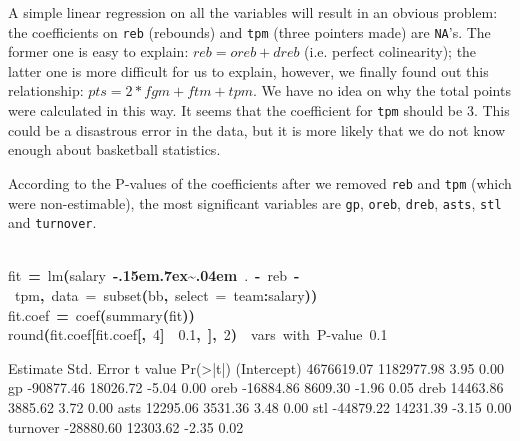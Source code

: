 \documentclass[english]{article}
\newenvironment{dummy}{\par}{\par}
\newcommand{\hlnumber}[1]{\textcolor[rgb]{0.0823529411764706,0.0784313725490196,0.709803921568627}{#1}}%
\newcommand{\hlfunctioncall}[1]{\textcolor[rgb]{1,0,0}{#1}}%
\newcommand{\hlkeyword}[1]{\textcolor[rgb]{0,0,0}{\textbf{#1}}}%
\newcommand{\hlargument}[1]{\textcolor[rgb]{0.694117647058824,0.247058823529412,0.0196078431372549}{#1}}%
\newcommand{\hlcomment}[1]{\textcolor[rgb]{0.8,0.8,0.8}{#1}}%
\newcommand{\hlassignement}[1]{\textcolor[rgb]{0.215686274509804,0.215686274509804,0.384313725490196}{\textbf{#1}}}%
\newcommand{\hlsymbol}[1]{\textcolor[rgb]{0,0,0}{#1}}%
\newcommand{\hlprompt}[1]{\textcolor[rgb]{0,0,0}{#1}}%
\def\urltilda{\kern -.15em\lower .7ex\hbox{\~{}}\kern .04em}%
\newcommand{\hlstd}[1]{\textcolor[rgb]{0,0,0}{#1}}%
\begin{document}
A simple linear regression on all the variables will result in an
obvious problem: the coefficients on \texttt{reb} (rebounds) and \texttt{tpm}
(three pointers made) are \texttt{NA}'s. The former one is easy to
explain: $reb=oreb+dreb$ (i.e. perfect colinearity); the latter one
is more difficult for us to explain, however, we finally found out
this relationship: $pts=2*fgm+ftm+tpm$. We have no idea on why the
total points were calculated in this way. It seems that the coefficient
for \texttt{tpm} should be 3. This could be a disastrous error in
the data, but it is more likely that we do not know enough about basketball
statistics.

According to the P-values of the coefficients after we removed \texttt{reb}
and \texttt{tpm} (which were non-estimable), the most significant
variables are \texttt{gp}, \texttt{oreb}, \texttt{dreb}, \texttt{asts},
\texttt{stl} and \texttt{turnover}. 
\begin{dummy}
\hspace*{\fill}\\
\hlstd{}\ttfamily\noindent
\hlprompt{\usebox{\hlnormalsizeboxgreaterthan}{\ }}\hlsymbol{fit}{\ }\hlassignement{=}{\ }\hlfunctioncall{lm}\hlkeyword{(}\hlsymbol{salary}{\ }\hlkeyword{\urltilda{}}{\ }\hlsymbol{.}{\ }\hlkeyword{-}{\ }\hlsymbol{reb}{\ }\hlkeyword{-}{\ }\hlsymbol{tpm}\hlkeyword{,}{\ }\hlargument{data}{\ }\hlargument{=}{\ }\hlfunctioncall{subset}\hlkeyword{(}\hlsymbol{bb}\hlkeyword{,}{\ }\hlargument{select}{\ }\hlargument{=}{\ }\hlsymbol{team}\hlkeyword{:}\hlsymbol{salary}\hlkeyword{)}\hlkeyword{)}\mbox{}
\normalfont
\hspace*{\fill}\\
\hlstd{}\ttfamily\noindent
\hlprompt{\usebox{\hlnormalsizeboxgreaterthan}{\ }}\hlsymbol{fit.coef}{\ }\hlassignement{=}{\ }\hlfunctioncall{coef}\hlkeyword{(}\hlfunctioncall{summary}\hlkeyword{(}\hlsymbol{fit}\hlkeyword{)}\hlkeyword{)}\mbox{}
\normalfont
\hspace*{\fill}\\
\hlstd{}\ttfamily\noindent
\hlprompt{\usebox{\hlnormalsizeboxgreaterthan}{\ }}\hlfunctioncall{round}\hlkeyword{(}\hlsymbol{fit.coef}\hlkeyword{[}\hlsymbol{fit.coef}\hlkeyword{[}\hlkeyword{,}{\ }\hlnumber{4}\hlkeyword{]}{\ }\hlkeyword{\usebox{\hlnormalsizeboxlessthan}}{\ }\hlnumber{0.1}\hlkeyword{,}{\ }\hlkeyword{]}\hlkeyword{,}{\ }\hlnumber{2}\hlkeyword{)}{\ }{\ }\hlcomment{\usebox{\hlnormalsizeboxhash}{\ }vars{\ }with{\ }P-value{\ }\usebox{\hlnormalsizeboxlessthan}{\ }0.1}\mbox{}
\normalfont
\hspace*{\fill}\\
\hlstd{}\begin{Schunk}
\begin{Soutput}
              Estimate Std. Error t value Pr(>|t|)
(Intercept) 4676619.07 1182977.98    3.95     0.00
gp           -90877.46   18026.72   -5.04     0.00
oreb         -16884.86    8609.30   -1.96     0.05
dreb          14463.86    3885.62    3.72     0.00
asts          12295.06    3531.36    3.48     0.00
stl          -44879.22   14231.39   -3.15     0.00
turnover     -28880.60   12303.62   -2.35     0.02
\end{Soutput}

\end{Schunk}
\end{dummy}
\end{document}
